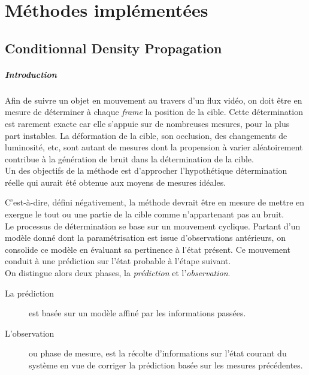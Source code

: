\documentclass[a4paper,12pt]{report}
\begin{document}
\pagebreak
\chapter{Méthodes implémentées}

\section{Conditionnal Density Propagation}
\paragraph{Introduction}
Afin de suivre un objet en mouvement au travers d'un flux vidéo, on doit être en mesure de déterminer à chaque \textit{frame} la position de la cible. 
Cette détermination est rarement exacte car elle s'appuie sur de nombreuses mesures, pour la plus part instables. 
La déformation de la cible, son occlusion, des changements de luminosité, etc, sont autant de mesures dont la propension à varier aléatoirement contribue à la génération de bruit dans la détermination de la cible.\\

Un des objectifs de la méthode est d'approcher l'hypothétique détermination réelle qui aurait été obtenue aux moyens de mesures idéales. 

C'est-à-dire, défini négativement, la méthode devrait être en mesure de mettre en exergue le tout ou une partie de la cible comme n'appartenant pas au bruit.\\

Le processus de détermination se base sur un mouvement cyclique. Partant d'un modèle donné dont la paramétrisation est issue d'observations antérieurs, on consolide ce modèle en évaluant sa pertinence à l'état présent. Ce mouvement conduit à une prédiction sur l'état probable à l'étape suivant.\\ 
On distingue alors deux phases, la \textit{prédiction} et l'\textit{observation}. 
\begin{description}
\item [La prédiction] est basée sur un modèle affiné par les informations passées.
\item [L'observation] ou phase de mesure, est la récolte d'informations sur l'état courant du système en vue de corriger la prédiction basée sur les mesures précédentes.\\
\end{description}
 
\end{document}
